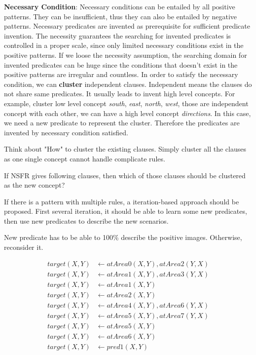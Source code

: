 \documentclass[
]{ceurart}
\begin{document}
\textbf{Necessary Condition}: %
Necessary conditions can be entailed by all positive patterns. They can be insufficient, thus they can also be entailed by negative patterns. Necessary predicates are invented as prerequisite for sufficient predicate invention.
The necessity guarantees the searching for invented predicates is controlled in a proper scale, since only limited necessary conditions exist in the positive patterns. 
If we loose the necessity assumption, the searching domain for invented predicates can be huge since the conditions that doesn't exist in the positive patterns are irregular and  countless. 
In order to satisfy the necessary condition, we can \textbf{cluster} independent clauses. Independent means the clauses do not share same predicates. It usually leads to invent high level concepts. For example, cluster low level concept \textit{south}, \textit{east}, \textit{north}, \textit{west}, those are independent concept with each other, we can have a high level concept \textit{directions}. In this case, we need a new predicate to represent the cluster. Therefore the predicates are invented by necessary condition satisfied.



Think about "How" to cluster the existing clauses. Simply cluster all the clauses as one single concept cannot handle complicate rules.

If NSFR gives following clauses, then which of those clauses should be clustered as the new concept?

If there is a pattern with multiple rules,
a iteration-based approach should be proposed.
First several iteration, it should be able to learn some new predicates, then use new predicates to describe the new scenarios.

New predicate has to be able to 100\% describe the positive images. Otherwise, reconsider it.

\begin{align*}
	target(X,Y) &\leftarrow atArea0(X,Y), atArea2(Y,X)  \\
	target(X,Y) &\leftarrow atArea1(X,Y),atArea3(Y,X) \\
	target(X,Y) &\leftarrow atArea1(X,Y) \\    
	target(X,Y) &\leftarrow atArea2(X,Y) \\    
	target(X,Y) &\leftarrow atArea4(X,Y),atArea6(Y,X) \\
	target(X,Y) &\leftarrow atArea5(X,Y),atArea7(Y,X) \\
	target(X,Y) &\leftarrow atArea5(X,Y) \\    
	target(X,Y) &\leftarrow atArea6(X,Y) \\
	target(X,Y) &\leftarrow pred1(X,Y) \\
\end{align*}
\end{document}
